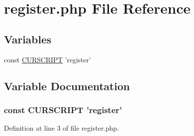 \hypertarget{register_8php}{\section{register.\+php File Reference}
\label{register_8php}
}
\subsection*{Variables}
\begin{DoxyCompactItemize}
\item 
const \hyperlink{register_8php_a39c39f525eceb86cabc338804f230e80}{C\+U\+R\+S\+C\+R\+I\+P\+T} 'register'
\end{DoxyCompactItemize}


\subsection{Variable Documentation}
\hypertarget{register_8php_a39c39f525eceb86cabc338804f230e80}{
\subsubsection[{C\+U\+R\+S\+C\+R\+I\+P\+T}]{\setlength{\rightskip}{0pt plus 5cm}const C\+U\+R\+S\+C\+R\+I\+P\+T 'register'}}\label{register_8php_a39c39f525eceb86cabc338804f230e80}


Definition at line 3 of file register.\+php.

